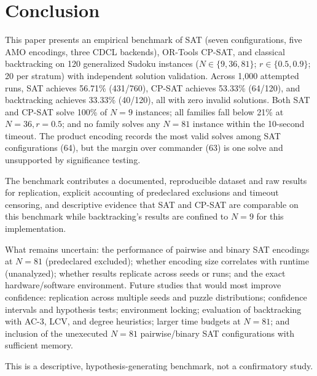 \documentclass[a4paper,fleqn]{cas-sc}
\begin{document}

\section{Conclusion}

This paper presents an empirical benchmark of SAT (seven configurations, five AMO encodings, three CDCL backends), OR-Tools CP-SAT, and classical backtracking on 120 generalized Sudoku instances (\(N \in \{9, 36, 81\}\); \(r \in \{0.5, 0.9\}\); 20 per stratum) with independent solution validation. Across 1{,}000 attempted runs, SAT achieves 56.71\% (431/760), CP-SAT achieves 53.33\% (64/120), and backtracking achieves 33.33\% (40/120), all with zero invalid solutions. Both SAT and CP-SAT solve 100\% of \(N=9\) instances; all families fall below 21\% at \(N=36, r=0.5\); and no family solves any \(N=81\) instance within the 10-second timeout. The product encoding records the most valid solves among SAT configurations (64), but the margin over commander (63) is one solve and unsupported by significance testing.

The benchmark contributes a documented, reproducible dataset and raw results for replication, explicit accounting of predeclared exclusions and timeout censoring, and descriptive evidence that SAT and CP-SAT are comparable on this benchmark while backtracking's results are confined to \(N=9\) for this implementation.

What remains uncertain: the performance of pairwise and binary SAT encodings at \(N=81\) (predeclared excluded); whether encoding size correlates with runtime (unanalyzed); whether results replicate across seeds or runs; and the exact hardware/software environment. Future studies that would most improve confidence: replication across multiple seeds and puzzle distributions; confidence intervals and hypothesis tests; environment locking; evaluation of backtracking with AC-3, LCV, and degree heuristics; larger time budgets at \(N=81\); and inclusion of the unexecuted \(N=81\) pairwise/binary SAT configurations with sufficient memory.

This is a descriptive, hypothesis-generating benchmark, not a confirmatory study.

\end{document}
